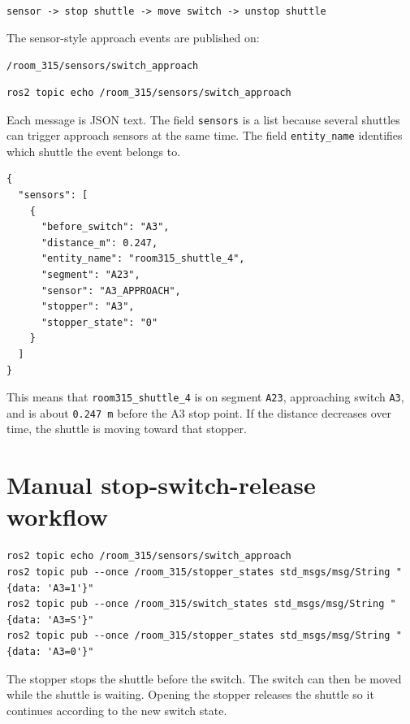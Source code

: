\documentclass[12pt,a4paper]{report}
\newcommand{\codenext}[1]{\par\Needspace{#1\baselineskip}}
\begin{document}
\begin{center}
\texttt{sensor -> stop shuttle -> move switch -> unstop shuttle}
\end{center}

The sensor-style approach events are published on:

\begin{center}
\texttt{/room\_315/sensors/switch\_approach}
\end{center}

\codenext{6}
\begin{lstlisting}[style=terminalcode,caption={Watching approach sensor events.}]
ros2 topic echo /room_315/sensors/switch_approach
\end{lstlisting}

Each message is JSON text. The field \texttt{sensors} is a list because several
shuttles can trigger approach sensors at the same time. The field
\texttt{entity\_name} identifies which shuttle the event belongs to.

\codenext{18}
\begin{lstlisting}[style=terminalcode,caption={Example approach sensor event.}]
{
  "sensors": [
    {
      "before_switch": "A3",
      "distance_m": 0.247,
      "entity_name": "room315_shuttle_4",
      "segment": "A23",
      "sensor": "A3_APPROACH",
      "stopper": "A3",
      "stopper_state": "0"
    }
  ]
}
\end{lstlisting}

This means that \texttt{room315\_shuttle\_4} is on segment \texttt{A23},
approaching switch \texttt{A3}, and is about \texttt{0.247 m} before the A3
stop point. If the distance decreases over time, the shuttle is moving toward
that stopper.

\section{Manual stop-switch-release workflow}

\codenext{8}
\begin{lstlisting}[style=terminalcode,caption={Manual stopper and switch workflow.}]
ros2 topic echo /room_315/sensors/switch_approach
ros2 topic pub --once /room_315/stopper_states std_msgs/msg/String "{data: 'A3=1'}"
ros2 topic pub --once /room_315/switch_states std_msgs/msg/String "{data: 'A3=S'}"
ros2 topic pub --once /room_315/stopper_states std_msgs/msg/String "{data: 'A3=0'}"
\end{lstlisting}

The stopper stops the shuttle before the switch. The switch can then be moved
while the shuttle is waiting. Opening the stopper releases the shuttle so it
continues according to the new switch state.
\end{document}
